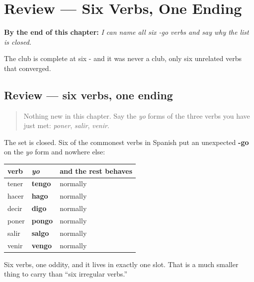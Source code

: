 
\chapter{Review --- Six Verbs, One Ending}
\label{ch:spanish-review-yo-go}

\begin{chapteropening}
\textbf{By the end of this chapter:} \emph{I can name all six -go verbs and say why the list is closed.}

The club is complete at six - and it was never a club, only six unrelated verbs that converged.
\end{chapteropening}

\section[Practice]{Review — six verbs, one ending}

\label{lesson:ES-C13-repaso-yo-go}



\begin{quote}
Nothing new in this chapter. Say the \emph{yo} forms of the three verbs you have just met: \emph{poner}, \emph{salir}, \emph{venir}.
\end{quote}

\begin{grammarlens}[title={What you've built}]
The set is closed. Six of the commonest verbs in Spanish put an unexpected \textbf{-go} on the \emph{yo} form and nowhere else:

\noindent
\begin{tabularx}{\linewidth}{@{}>{\raggedright\arraybackslash}X>{\raggedright\arraybackslash}X>{\raggedright\arraybackslash}X@{}}
\toprule
\textbf{verb} & \textbf{\emph{yo}} & \textbf{and the rest behaves} \\
\midrule
tener & \textbf{tengo} & normally \\
hacer & \textbf{hago} & normally \\
decir & \textbf{digo} & normally \\
poner & \textbf{pongo} & normally \\
salir & \textbf{salgo} & normally \\
venir & \textbf{vengo} & normally \\
\bottomrule
\end{tabularx}

Six verbs, one oddity, and it lives in exactly one slot. That is a much smaller thing to carry than \textquotedblleft{}six irregular verbs.\textquotedblright{}
\end{grammarlens}

